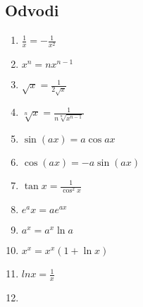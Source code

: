 \subsection{Odvodi}
\begin{center}
	\begin{small}
		\begin{enumerate}
			\item \begin{math}
				      \frac{1}{x} = -\frac{1}{x^2}
			      \end{math}
			\item \begin{math}
				      x^n  = nx^{n-1}
			      \end{math}
			\item \begin{math}
				      \sqrt{x} = \frac{1}{2 \sqrt{x}}
			      \end{math}
			\item \begin{math}
				      \sqrt[n] x = \frac{1}{n \sqrt[n]{x^{n-1}}}
			      \end{math}
			\item \begin{math}
				      \sin (a x) =  a  \cos a x
			      \end{math}
			\item  \begin{math}
				      \cos (a x) = - a \sin (a x)
			      \end{math}
			\item \begin{math}
				      \tan x = \frac{1}{\cos^2 x}
			      \end{math}
			\item \begin{math}
				      e^ax = ae^{ax}
			      \end{math}
			\item \begin{math}
				      a^x = a^x \ln a
			      \end{math}
			\item \begin{math}
				      x^x = x^x (1+\ln x)
			      \end{math}
			\item \begin{math}
				      ln x = \frac{1}{x}
			      \end{math}
			\item \begin{math}

\end{math}
\end{enumerate}
\end{small}
\end{center}
